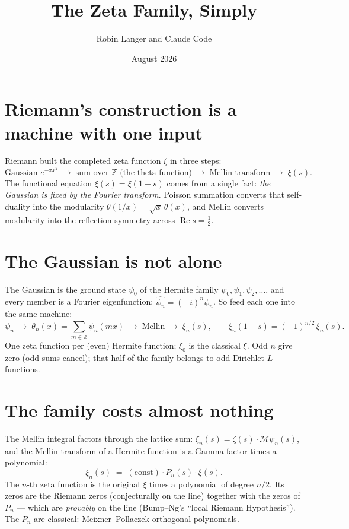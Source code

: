 \documentclass[11pt]{article}
\title{The Zeta Family, Simply}
\author{Robin Langer and Claude Code}
\date{August 2026}
\newcommand{\Z}{\mathbb{Z}}
\begin{document}
\maketitle

\section{Riemann's construction is a machine with one input}

Riemann built the completed zeta function $\xi$ in three steps:
\[
\text{Gaussian } e^{-\pi x^2}
\;\longrightarrow\;
\text{sum over } \Z \text{ (the theta function)}
\;\longrightarrow\;
\text{Mellin transform}
\;\longrightarrow\;
\xi(s).
\]
The functional equation $\xi(s) = \xi(1-s)$ comes from a single fact: \emph{the Gaussian is fixed by the Fourier transform}. Poisson summation converts that self-duality into the modularity $\theta(1/x) = \sqrt{x}\,\theta(x)$, and Mellin converts modularity into the reflection symmetry across $\operatorname{Re} s = \tfrac12$.

\section{The Gaussian is not alone}

The Gaussian is the ground state $\psi_0$ of the Hermite family $\psi_0, \psi_1, \psi_2, \dots$, and every member is a Fourier eigenfunction: $\widehat{\psi_n} = (-i)^n \psi_n$. So feed each one into the same machine:
\[
\psi_n
\;\longrightarrow\;
\theta_n(x) = \sum_{m\in\Z} \psi_n(mx)
\;\longrightarrow\;
\text{Mellin}
\;\longrightarrow\;
\xi_n(s),
\qquad
\xi_n(1-s) = (-1)^{n/2}\,\xi_n(s).
\]
One zeta function per (even) Hermite function; $\xi_0$ is the classical $\xi$. Odd $n$ give zero (odd sums cancel); that half of the family belongs to odd Dirichlet $L$-functions.

\section{The family costs almost nothing}

The Mellin integral factors through the lattice sum: $\xi_n(s) = \zeta(s) \cdot \mathcal{M}\psi_n(s)$, and the Mellin transform of a Hermite function is a Gamma factor times a polynomial:
\[
\boxed{\;\xi_n(s) \;=\; (\text{const}) \cdot P_n(s) \cdot \xi(s).\;}
\]
The $n$-th zeta function is the original $\xi$ times a polynomial of degree $n/2$. Its zeros are the Riemann zeros (conjecturally on the line) together with the zeros of $P_n$ --- which are \emph{provably} on the line (Bump--Ng's ``local Riemann Hypothesis''). The $P_n$ are classical: Meixner--Pollaczek orthogonal polynomials.
\end{document}
